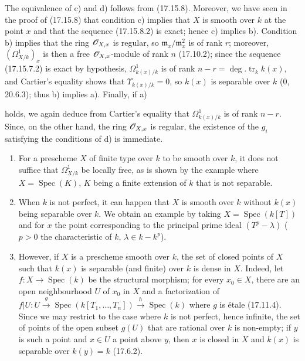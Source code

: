The equivalence of c) and d) follows from (17.15.8). Moreover, we have seen in the proof of (17.15.8) that condition c) implies that $X$ is smooth over $k$ at the point $x$ and that the sequence (17.15.8.2) is exact; hence c) implies b). Condition b) implies that the ring $\mathscr{O}_{X,x}$ is regular, so $\mathfrak m_x/\mathfrak m_x^2$ is of rank $r$; moreover, $(\Omega^1_{X/k})_x$ is then a free $\mathscr{O}_{X,x}$-module of rank $n$ (17.10.2); since the sequence (17.15.7.2) is exact by hypothesis, $\Omega^1_{k(x)/k}$ is of rank $n-r=\deg.\operatorname{tr}_k k(x)$, and Cartier's equality shows that $\Upsilon_{k(x)/k}=0$, so $k(x)$ is separable over $k$ (0, 20.6.3); thus b) implies a). Finally, if a)


holds, we again deduce from Cartier's equality that $\Omega^1_{k(x)/k}$ is of rank $n-r$. Since, on the other hand, the ring $\mathscr{O}_{X,x}$ is regular, the existence of the $g_i$ satisfying the conditions of d) is immediate.

\begin{remarks}[17.15.10]
\label{IV.17.15.10}
\begin{enumerate}
  \item[(i)] For a prescheme $X$ of finite type over $k$ to be smooth over $k$, it does not suffice that $\Omega^1_{X/k}$ be locally free, as is shown by the example where $X=\operatorname{Spec}(K)$, $K$ being a finite extension of $k$ that is not separable.
  \item[(ii)] When $k$ is not perfect, it can happen that $X$ is smooth over $k$ without $k(x)$ being separable over $k$. We obtain an example by taking $X=\operatorname{Spec}(k[T])$ and for $x$ the point corresponding to the principal prime ideal $(T^p-\lambda)$ ($p>0$ the characteristic of $k$, $\lambda\in k-k^p$).
  \item[(iii)] However, if $X$ is a prescheme smooth over $k$, the set of closed points of $X$ such that $k(x)$ is separable (and finite) over $k$ is dense in $X$. Indeed, let $f:X\to\operatorname{Spec}(k)$ be the structural morphism; for every $x_0\in X$, there are an open neighbourhood $U$ of $x_0$ in $X$ and a factorization of $f|U:U\xrightarrow{g}\operatorname{Spec}(k[T_1,\ldots,T_n])\xrightarrow{h}\operatorname{Spec}(k)$ where $g$ is étale (17.11.4). Since we may restrict to the case where $k$ is not perfect, hence infinite, the set of points of the open subset $g(U)$ that are rational over $k$ is non-empty; if $y$ is such a point and $x\in U$ a point above $y$, then $x$ is closed in $X$ and $k(x)$ is separable over $k(y)=k$ (17.6.2).
\end{enumerate}
\end{remarks}

